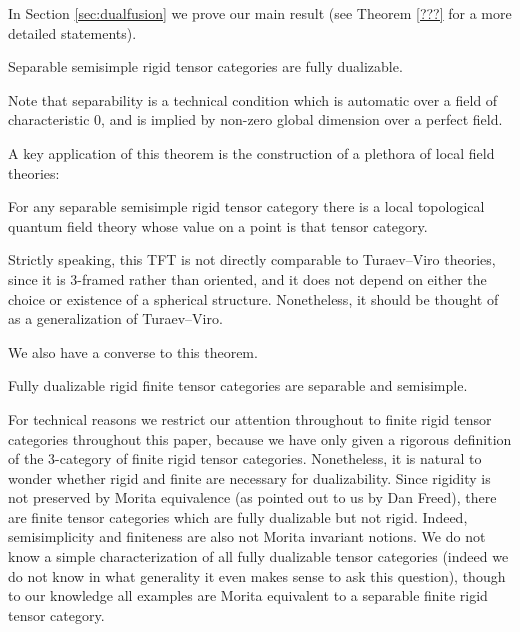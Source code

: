 \documentclass{amsart}
\begin{document}
In Section \ref{sec:dualfusion} we prove our main result (see Theorem \ref{???} for a more detailed statements).


\begin{theorem}
Separable semisimple rigid tensor categories are fully dualizable.
\end{theorem}

\nid Note that separability is a technical condition which is automatic over a field of characteristic $0$, and is implied by non-zero global dimension over a perfect field.


A key application of this theorem is the construction of a plethora of local field theories:
\begin{corollary}
For any separable semisimple rigid tensor category there is a local topological quantum field theory whose value on a point is that tensor category.
\end{corollary}

\nid Strictly speaking, this TFT is not directly comparable to Turaev--Viro theories, since it is $3$-framed rather than oriented, and it does not depend on either the choice or existence of a spherical structure.  Nonetheless, it should be thought of as a generalization of Turaev--Viro.

We also have a converse to this theorem.

\begin{theorem}
Fully dualizable rigid finite tensor categories are separable and semisimple.
\end{theorem}

For technical reasons we restrict our attention throughout to finite rigid tensor categories throughout this paper, because we have only given a rigorous definition of the $3$-category of finite rigid tensor categories.  Nonetheless, it is natural to wonder whether rigid and finite are necessary for dualizability.  Since rigidity is not preserved by Morita equivalence (as pointed out to us by Dan Freed), there are finite tensor categories which are fully dualizable but not rigid.  Indeed, semisimplicity and finiteness are also not Morita invariant notions.  We do not know a simple characterization of all fully dualizable tensor categories (indeed we do not know in what generality it even makes sense to ask this question), though to our knowledge all examples are Morita equivalent to a separable finite rigid tensor category.
\end{document}
